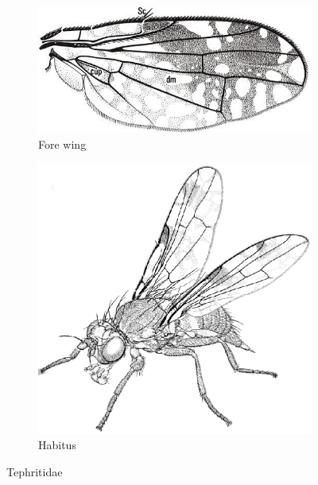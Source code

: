 \documentclass[letterpaper, 11pt]{article}
\begin{document}
\begin{figure}[ht!]
    \centering
    \begin{subfigure}[ht!]{0.45\textwidth}
        \includegraphics[width=\textwidth]{TephritidWing}
        \caption{Fore wing \citep[][Fig. 4.56]{mcalpine1981manual}}
        \label{fig:tephritid1}
    \end{subfigure}
    \qquad
    \begin{subfigure}[ht!]{0.4\textwidth}
        \includegraphics[width=\textwidth]{TephritidHabitus}
        \caption{Habitus \citep[][Fig. 66.1]{mcalpine1981manualv2}}
        \label{fig:tephritid2}
    \end{subfigure}
    \caption{Tephritidae}\label{fig:tephritids}
\end{figure}
\end{document}
